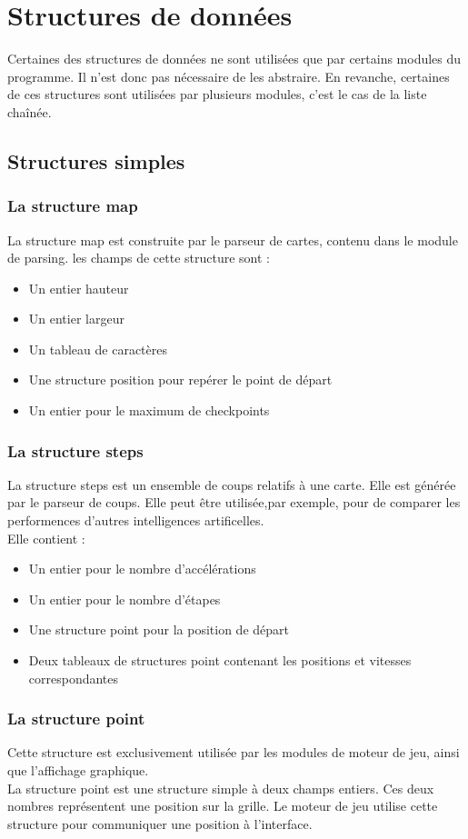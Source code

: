 \section{Structures de données}
	
Certaines des structures de données ne sont utilisées que par certains modules du programme. Il n'est donc pas nécessaire de les abstraire. En revanche, certaines de ces structures sont utilisées par plusieurs modules, c'est le cas de la liste chaînée.
	\subsection{Structures simples}
    
	\subsubsection{La structure map}
    La structure map est construite par le parseur de cartes, contenu dans le module de parsing.
	les champs de cette structure sont :
	\begin{itemize}
		\item Un entier hauteur
		\item Un entier largeur
		\item Un tableau de caractères
		\item Une structure position pour repérer le point de départ
		\item Un entier pour le maximum de checkpoints
	\end{itemize}	
    
	\subsubsection{La structure steps}
	La structure steps est un ensemble de coups relatifs à une carte. Elle est générée par le parseur de coups. Elle peut être utilisée,par exemple, pour de comparer les performences d'autres intelligences artificelles.\\
Elle contient : 
	\begin{itemize}
		\item Un entier pour le nombre d'accélérations
		\item Un entier pour le nombre d'étapes
		\item Une structure point pour la position de départ
		\item Deux tableaux de structures point contenant les positions et vitesses correspondantes
	\end{itemize}	
	\subsubsection{La structure point}
    Cette structure est exclusivement utilisée par les modules de moteur de jeu, ainsi que l'affichage graphique. \\
	La structure point est une structure simple à deux champs entiers. Ces deux nombres représentent une position sur la grille. Le moteur de jeu utilise cette structure pour communiquer une position à l'interface.\\
	
